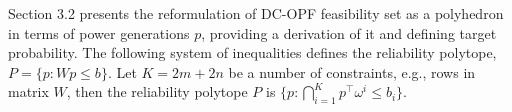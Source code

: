 Section 3.2 presents the reformulation of DC-OPF feasibility set as a polyhedron in terms of power generations $p$, providing a derivation of it and defining target probability.
The following system of inequalities defines the reliability polytope, $P = \{p: Wp \le b\}$.
Let $K = 2m + 2n$ be a number of constraints, e.g., rows in matrix $W$, then the reliability polytope $P$ is $\bigl\{p\!:\! \bigcap_{i=1}^K p^\top\!\!\omega^i \le b_i\bigr\}$.

